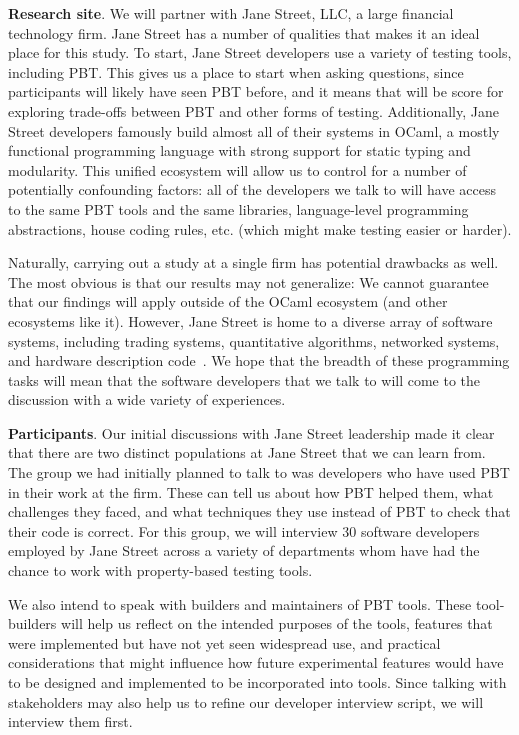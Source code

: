 \textbf{Research site}. We will partner with Jane Street, LLC, a large
financial technology firm.
Jane Street has a number of qualities that makes it an ideal place for
this study. To start, Jane Street developers use
a variety of testing tools, including PBT. This gives us a place to start
when asking questions, since participants will likely have seen PBT before,
and it means that will be score for exploring trade-offs between PBT and
other forms of testing.
Additionally, Jane Street developers famously build almost all of their
systems in OCaml, a mostly functional programming language with strong support
for static typing and modularity. This unified ecosystem
will allow
us to control for a number of potentially confounding factors: all of the
developers we talk to will have access to the same PBT tools and the same
libraries, language-level programming abstractions, house coding rules,
etc. (which might make testing easier or harder).

Naturally, carrying out a study at a single firm has potential drawbacks as
well. The most obvious is that our results may not generalize: We
cannot guarantee that our findings will apply outside of the OCaml ecosystem (and
other ecosystems like it). However, Jane Street is home to a diverse array of
software systems, including trading systems, quantitative
algorithms, networked systems, and hardware description code~\cite{signalsandthreads}.
We hope that the breadth of these programming tasks will mean that the software
developers that we talk to will come to the discussion with a wide variety of
experiences.

\textbf{Participants}.
Our initial discussions with Jane Street leadership made it clear that there are
two distinct populations at Jane Street that we can learn from. The group we had
initially planned to talk to was developers who have used PBT in
their work at the firm. These can tell us about how PBT helped them,
what challenges they faced, and what techniques they use instead of
PBT to check that their code is correct. For this group, we will interview 30 software developers employed by Jane Street across a variety of departments whom have had the chance to work with property-based testing tools.

We also intend to speak with builders and maintainers of PBT tools. These
tool-builders will help us reflect on the intended purposes of the tools,
features that were implemented but have not yet seen widespread use, and
practical considerations that might influence how future experimental features
would have to be designed and implemented to be incorporated into tools. Since talking with
stakeholders may also help us to refine our developer interview script, we will
interview them first.

